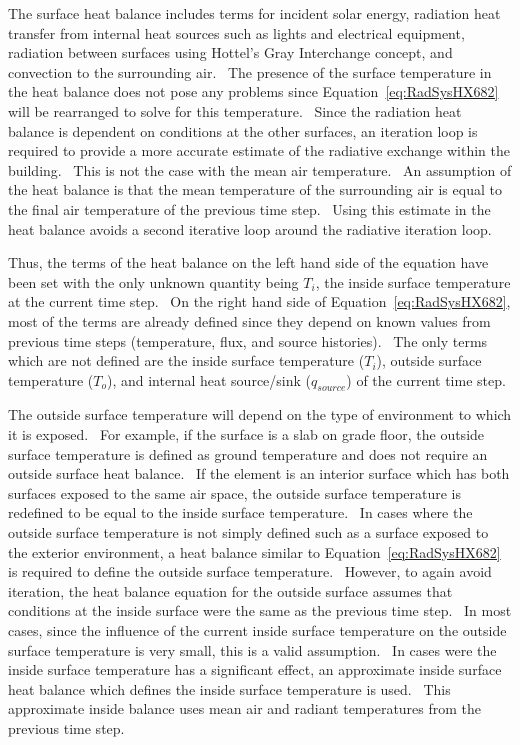 The surface heat balance includes terms for incident solar energy, radiation heat transfer from internal heat sources such as lights and electrical equipment, radiation between surfaces using Hottel's Gray Interchange concept, and convection to the surrounding air.~ The presence of the surface temperature in the heat balance does not pose any problems since Equation~\ref{eq:RadSysHX682} will be rearranged to solve for this temperature.~ Since the radiation heat balance is dependent on conditions at the other surfaces, an iteration loop is required to provide a more accurate estimate of the radiative exchange within the building.~ This is not the case with the mean air temperature.~ An assumption of the heat balance is that the mean temperature of the surrounding air is equal to the final air temperature of the previous time step.~ Using this estimate in the heat balance avoids a second iterative loop around the radiative iteration loop.

Thus, the terms of the heat balance on the left hand side of the equation have been set with the only unknown quantity being \(T_i\), the inside surface temperature at the current time step.~ On the right hand side of Equation~\ref{eq:RadSysHX682}, most of the terms are already defined since they depend on known values from previous time steps (temperature, flux, and source histories).~ The only terms which are not defined are the inside surface temperature (\(T_i\)), outside surface temperature (\(T_o\)), and internal heat source/sink (\(q_{source}\)) of the current time step.

The outside surface temperature will depend on the type of environment to which it is exposed.~ For example, if the surface is a slab on grade floor, the outside surface temperature is defined as ground temperature and does not require an outside surface heat balance.~ If the element is an interior surface which has both surfaces exposed to the same air space, the outside surface temperature is redefined to be equal to the inside surface temperature.~ In cases where the outside surface temperature is not simply defined such as a surface exposed to the exterior environment, a heat balance similar to Equation~\ref{eq:RadSysHX682} is required to define the outside surface temperature.~ However, to again avoid iteration, the heat balance equation for the outside surface assumes that conditions at the inside surface were the same as the previous time step.~ In most cases, since the influence of the current inside surface temperature on the outside surface temperature is very small, this is a valid assumption.~ In cases were the inside surface temperature has a significant effect, an approximate inside surface heat balance which defines the inside surface temperature is used.~ This approximate inside balance uses mean air and radiant temperatures from the previous time step.

